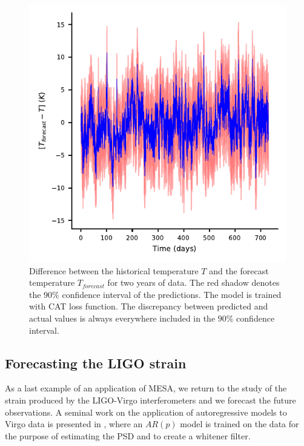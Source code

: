 \documentclass{aa}
\begin{document}
\begin{figure}
	\caption{Difference between the historical temperature $T$ and the forecast temperature $T_{forecast}$ for two years of data. The red shadow denotes the $90\%$ confidence interval of the predictions. The model is trained with CAT loss function. The discrepancy between predicted and actual values is always everywhere included in the $90\%$ confidence interval.}
	\label{fig:temp_forecast}
	\includegraphics{Images/climate_plots/forecast_accuracy.pdf}
\end{figure}

\subsection{Forecasting the LIGO strain} \label{sec:LIGO_forecasting}
As a last example of an application of MESA, we return to the study of the strain produced by the LIGO-Virgo interferometers 
and we forecast the future observations.
A seminal work on the application of autoregressive models to Virgo data is presented in \citet{Cuoco_2001}, where an $AR(p)$ model is trained on the data for the purpose of estimating the PSD and to create a whitener filter.
\end{document}
